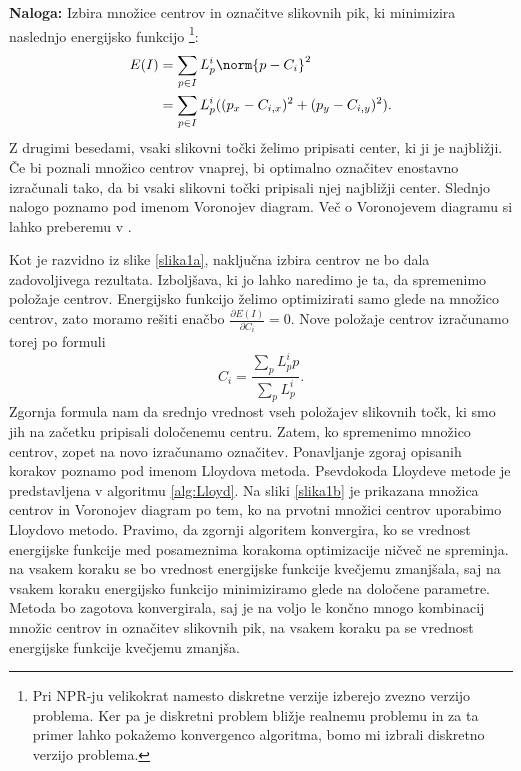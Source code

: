 \textbf{Naloga:} Izbira množice centrov in označitve slikovnih pik, ki minimizira naslednjo energijsko funkcijo \footnote{Pri NPR-ju velikokrat namesto diskretne verzije izberejo zvezno verzijo problema. Ker pa je diskretni problem bližje realnemu problemu in za ta primer lahko pokažemo konvergenco algoritma, bomo mi izbrali diskretno verzijo problema.}:
%
\begin{align*}
E(I) & = \sum_{p \in I} L_p^i \norm{p - C_i}^2 \\
       & = \sum_{p \in I} L_p^i ((p_x - C_{i, x})^2 + (p_y - C_{i, y})^2) .
\end{align*}
%
Z drugimi besedami, vsaki slikovni točki želimo pripisati center, ki ji je najbližji. Če bi poznali množico centrov vnaprej, bi optimalno označitev enostavno izračunali tako, da bi vsaki slikovni točki pripisali njej najbližji center. Slednjo nalogo poznamo pod imenom Voronojev diagram. Več o Voronojevem diagramu si lahko preberemu v \cite{voronoi}.

Kot je razvidno iz slike \ref{slika1a}, naključna izbira centrov ne bo dala zadovoljivega rezultata. Izboljšava, ki jo lahko naredimo je ta, da spremenimo položaje centrov. Energijsko funkcijo želimo optimizirati samo glede na množico centrov, zato moramo rešiti enačbo $\frac{\partial E(I)}{\partial C_i} = 0$. Nove položaje centrov izračunamo torej po formuli
%
$$C_i = \frac{\sum_p L_p^i p}{\sum_p L_p^i}.$$
%
Zgornja formula nam da srednjo vrednost vseh položajev slikovnih točk, ki smo jih na začetku pripisali določenemu centru. Zatem, ko spremenimo množico centrov, zopet na novo izračunamo označitev. Ponavljanje zgoraj opisanih korakov poznamo pod imenom Lloydova metoda. Psevdokoda Lloydeve metode je predstavljena v algoritmu \ref{alg:Lloyd}.
%
%
Na sliki \ref{slika1b} je prikazana množica centrov in Voronojev diagram po tem, ko na prvotni množici centrov uporabimo Lloydovo metodo. Pravimo, da zgornji algoritem konvergira, ko se vrednost energijske funkcije med posameznima korakoma optimizacije ničveč ne spreminja. na vsakem koraku se bo vrednost energijske funkcije kvečjemu zmanjšala, saj na vsakem koraku energijsko funkcijo minimiziramo glede na določene parametre. Metoda bo zagotova konvergirala, saj je na voljo le končno mnogo kombinacij množic centrov in označitev slikovnih pik, na vsakem koraku pa se vrednost energijske funkcije kvečjemu zmanjša.
